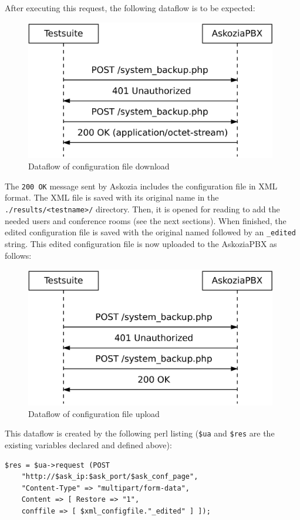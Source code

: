 After executing this request, the following dataflow is to be expected:
\begin{figure} [h!]
\centering
\includegraphics [width=11cm] {config-2}
\caption {Dataflow of configuration file download}
\end{figure}

The \texttt{200 OK} message sent by Askozia includes the configuration file in XML format. The XML file is saved with its original name
in the \texttt{./results/<testname>/} directory. Then, it is opened for reading to add the needed users and conference rooms
(see the next sections). When finished, the edited configuration file is saved with the original named followed by an \texttt{\_edited}
string. This edited configuration file is now uploaded to the AskoziaPBX as follows: \newpage

\begin{figure} [htbp]
\centering
\includegraphics [width=11cm] {config-3}
\caption {Dataflow of configuration file upload}
\end{figure}

This dataflow is created by the following perl listing (\texttt{\$ua} and \texttt{\$res} are the existing variables declared and defined above):

\begin{lstlisting}[breaklines=true,label=code:config-post-request-upload,caption={POST request for uploading configuration file} ]
$res = $ua->request (POST
    "http://$ask_ip:$ask_port/$ask_conf_page",
	"Content-Type" => "multipart/form-data",
    Content => [ Restore => "1",
    conffile => [ $xml_configfile."_edited" ] ]);
\end{lstlisting}

